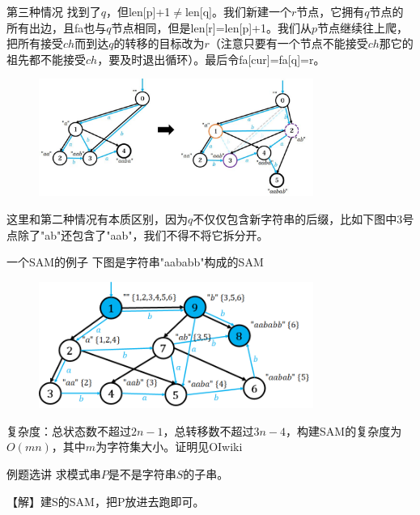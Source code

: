 \documentclass{beamer}
\begin{document}
\begin{frame}{第三种情况}
    \small
    找到了$q$，但len[p]+1$\neq$len[q]。我们新建一个$r$节点，它拥有$q$节点的所有出边，且fa也与$q$节点相同，但是len[r]=len[p]+1。我们从$p$节点继续往上爬，把所有接受$ch$而到达$q$的转移的目标改为$r$（注意只要有一个节点不能接受$ch$那它的祖先都不能接受$ch$，要及时退出循环）。最后令fa[cur]=fa[q]=r。
    
    \begin{figure}[H]
        \centering
        \includegraphics[width=0.8\textwidth]{pic/case3.jpg}
    \end{figure}

    \pause 这里和第二种情况有本质区别，因为$q$不仅仅包含新字符串的后缀，比如下图中3号点除了"ab"还包含了"aab"，我们不得不将它拆分开。
\end{frame}

\begin{frame}{一个SAM的例子}
    \small
    下图是字符串"aababb"构成的SAM

    \begin{figure}[H]
        \centering
        \includegraphics[width=0.8\textwidth]{pic/sameg.png}
    \end{figure}

    复杂度：总状态数不超过$2n-1$，总转移数不超过$3n-4$，构建SAM的复杂度为$O(mn)$，其中$m$为字符集大小。证明见OIwiki
\end{frame}

\begin{frame}{例题选讲}
    \small
    求模式串$P$是不是字符串$S$的子串。

    \pause 【解】建S的SAM，把P放进去跑即可。
\end{frame}
\end{document}
